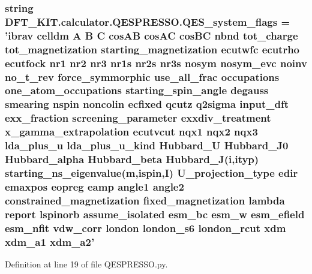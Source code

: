 \hypertarget{namespace_d_f_t___k_i_t_1_1calculator_1_1_q_e_s_p_r_e_s_s_o_a4fc2949def8bc4b8a2802d0e542f63dc}{
\subsubsection[{Q\+E\+S\+\_\+system\+\_\+flags}]{\setlength{\rightskip}{0pt plus 5cm}string D\+F\+T\+\_\+\+K\+I\+T.\+calculator.\+Q\+E\+S\+P\+R\+E\+S\+S\+O.\+Q\+E\+S\+\_\+system\+\_\+flags = 'ibrav celldm A B C cos\+A\+B cos\+A\+C cos\+B\+C nbnd tot\+\_\+charge tot\+\_\+magnetization starting\+\_\+magnetization ecutwfc ecutrho ecutfock nr1 nr2 nr3 nr1s nr2s nr3s nosym nosym\+\_\+evc noinv no\+\_\+t\+\_\+rev force\+\_\+symmorphic use\+\_\+all\+\_\+frac occupations one\+\_\+atom\+\_\+occupations starting\+\_\+spin\+\_\+angle degauss smearing nspin noncolin ecfixed qcutz q2sigma input\+\_\+dft exx\+\_\+fraction screening\+\_\+parameter exxdiv\+\_\+treatment x\+\_\+gamma\+\_\+extrapolation ecutvcut nqx1 nqx2 nqx3 lda\+\_\+plus\+\_\+u lda\+\_\+plus\+\_\+u\+\_\+kind Hubbard\+\_\+\+U Hubbard\+\_\+\+J0 Hubbard\+\_\+alpha Hubbard\+\_\+beta Hubbard\+\_\+\+J(i,ityp) starting\+\_\+ns\+\_\+eigenvalue(m,ispin,I) U\+\_\+projection\+\_\+type edir emaxpos eopreg eamp angle1 angle2 constrained\+\_\+magnetization fixed\+\_\+magnetization lambda report lspinorb assume\+\_\+isolated esm\+\_\+bc esm\+\_\+w esm\+\_\+efield esm\+\_\+nfit vdw\+\_\+corr london london\+\_\+s6 london\+\_\+rcut xdm xdm\+\_\+a1 xdm\+\_\+a2'}}\label{namespace_d_f_t___k_i_t_1_1calculator_1_1_q_e_s_p_r_e_s_s_o_a4fc2949def8bc4b8a2802d0e542f63dc}


Definition at line 19 of file Q\+E\+S\+P\+R\+E\+S\+S\+O.\+py.

